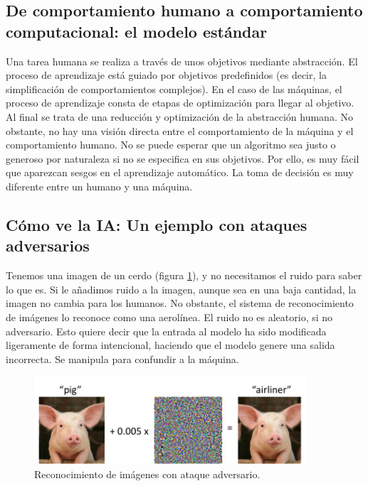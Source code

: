\subsection{De comportamiento humano a comportamiento computacional: el modelo estándar}
Una tarea humana se realiza a través de unos objetivos mediante abstracción. El proceso de aprendizaje está guiado por objetivos predefinidos (es decir, la simplificación de comportamientos complejos). En el caso de las máquinas,  el proceso de aprendizaje consta de etapas de optimización para llegar al objetivo. Al final se trata de una reducción y optimización de la abstracción humana. No obstante, no hay una visión directa entre el comportamiento de la máquina y el comportamiento humano. No se puede esperar que un algoritmo sea justo o generoso por naturaleza si no se especifica en sus objetivos. Por ello, es muy fácil que aparezcan sesgos en el aprendizaje automático. La toma de decisión es muy diferente entre un humano y una máquina.

\subsection{Cómo ve la IA: Un ejemplo con ataques adversarios}
Tenemos una imagen de un cerdo (figura \ref{fig:pig}), y no necesitamos el ruido para saber lo que es. Si le añadimos ruido a la imagen, aunque sea en una baja cantidad, la imagen no cambia para los humanos. No obstante, el sistema de reconocimiento de imágenes lo reconoce como una aerolínea. El ruido no es aleatorio, si no adversario. Esto quiere decir que la entrada al modelo ha sido modificada ligeramente de forma intencional, haciendo que el modelo genere una salida incorrecta. Se manipula para confundir a la máquina.

\begin{figure}[htbp]
\centering
\includegraphics[width = 0.9\textwidth]{figs/pig-ai.png}
\caption{Reconocimiento de imágenes con ataque adversario.}
\label{fig:pig}
\end{figure}

